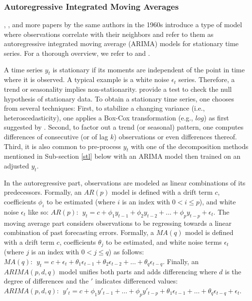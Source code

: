 \subsubsection{Autoregressive Integrated Moving Averages}
\label{arima}

\cite{box1962}, \cite{box1968}, and more papers by the same authors in the
    1960s introduce a type of model where observations correlate with their
    neighbors and refer to them as autoregressive integrated moving average
    (ARIMA) models for stationary time series.
For a thorough overview, we refer to \cite{box2015} and \cite{brockwell2016}.

A time series $y_t$ is stationary if its moments are independent of the
    point in time where it is observed.
A typical example is a white noise $\epsilon_t$ series.
Therefore, a trend or seasonality implies non-stationarity.
\cite{kwiatkowski1992} provide a test to check the null hypothesis of
    stationary data.
To obtain a stationary time series, one chooses from several techniques:
First, to stabilize a changing variance (i.e., heteroscedasticity), one
    applies a Box-Cox transformation (e.g., $log$) as first suggested by
    \cite{box1964}.
Second, to factor out a trend (or seasonal) pattern, one computes differences
    of consecutive (or of lag $k$) observations or even differences thereof.
Third, it is also common to pre-process $y_t$ with one of the decomposition
    methods mentioned in Sub-section \ref{stl} below with an ARIMA model
    then trained on an adjusted $y_t$.

In the autoregressive part, observations are modeled as linear combinations of
    its predecessors.
Formally, an $AR(p)$ model is defined with a drift term $c$, coefficients
    $\phi_i$ to be estimated (where $i$ is an index with $0 < i \leq p$), and
    white noise $\epsilon_t$ like so:
$
AR(p): \ \
y_t = c + \phi_1 y_{t-1} + \phi_2 y_{t-2} + \dots + \phi_p y_{t-p}
      + \epsilon_t
$.
The moving average part considers observations to be regressing towards a
    linear combination of past forecasting errors.
Formally, a $MA(q)$ model is defined with a drift term $c$, coefficients
    $\theta_j$ to be estimated, and white noise terms $\epsilon_t$ (where $j$
    is an index with $0 < j \leq q$) as follows:
$
MA(q): \ \
y_t = c + \epsilon_t + \theta_1 \epsilon_{t-1} + \theta_2 \epsilon_{t-2}
      + \dots + \theta_q \epsilon_{t-q}
$.
Finally, an $ARIMA(p,d,q)$ model unifies both parts and adds differencing
    where $d$ is the degree of differences and the $'$ indicates differenced
    values:
$
ARIMA(p,d,q): \ \
y'_t = c + \phi_1 y'_{t-1} + \dots + \phi_p y'_{t-p} + \theta_1 \epsilon_{t-1}
       + \dots + \theta_q \epsilon_{t-q} + \epsilon_{t}
$.

